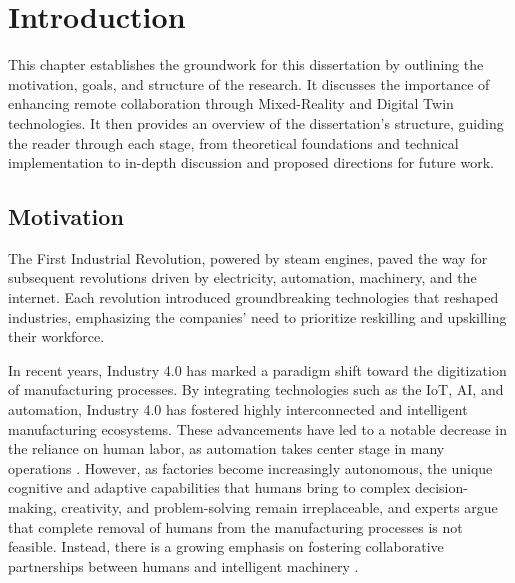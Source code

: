 \chapter{Introduction}%
\label{chapter:introduction}

\begin{introduction}
This chapter establishes the groundwork for this dissertation by outlining the motivation, goals, and structure of the research. It discusses the importance of enhancing remote collaboration through Mixed-Reality and Digital Twin technologies. It then provides an overview of the dissertation’s structure, guiding the reader through each stage, from theoretical foundations and technical implementation to in-depth discussion and proposed directions for future work.
\end{introduction}

\section{Motivation}
\label{section:Motivation}
% 
The First Industrial Revolution, powered by steam engines, paved the way for subsequent revolutions driven by electricity, automation, machinery, 
and the internet. Each revolution introduced groundbreaking technologies that reshaped industries, emphasizing the companies' need to prioritize reskilling 
and upskilling their workforce.

In recent years, Industry 4.0 has marked a paradigm shift toward the digitization of manufacturing processes. By integrating technologies such as the \ac{IoT}, \ac{AI}, and automation, Industry 4.0 has fostered highly interconnected and intelligent manufacturing ecosystems. These advancements have led to a notable decrease in the reliance on human labor, as automation takes center stage in many operations \cite{Ahmed2022, Zalozhnev2023}.
However, as factories become increasingly autonomous, the unique cognitive and adaptive capabilities that humans bring to complex decision-making, creativity, and problem-solving remain irreplaceable, and experts argue that complete removal of humans from the manufacturing processes is not feasible. Instead, there is a growing emphasis on fostering collaborative partnerships between humans and intelligent machinery \cite{Weiss2021, Maddikunta2022}.

